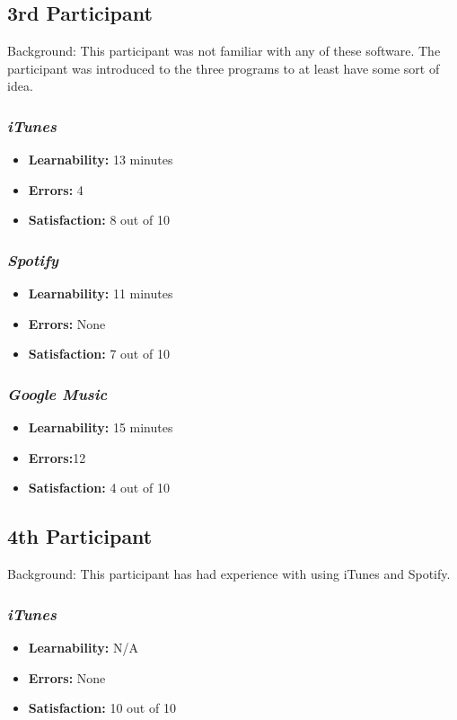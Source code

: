 \documentclass{article}
\begin{document}
\begin{multicols}{2}
\subsection{3rd Participant}
Background: This participant was not familiar with any of these software. The participant was introduced to the three programs to at least have some sort of idea.

\subsubsection{\it iTunes}
\begin{itemize}
	\item {\bf Learnability:} 13 minutes
	\item {\bf Errors:} 4
	\item {\bf Satisfaction:} 8 out of 10 
\end{itemize}

\subsubsection{\it Spotify}
\begin{itemize}
	\item {\bf Learnability:} 11 minutes
	\item {\bf Errors:} None
	\item {\bf Satisfaction:} 7 out of 10 
\end{itemize}

\subsubsection{\it Google Music}
\begin{itemize}
\item {\bf Learnability:} 15 minutes
	\item {\bf Errors:}12
	\item {\bf Satisfaction:} 4 out of 10 
\end{itemize}

\subsection{4th Participant}
Background: This participant has had experience with using iTunes and Spotify.

\subsubsection{\it iTunes}
\begin{itemize}
	\item {\bf Learnability:} N/A
	\item {\bf Errors:} None
	\item {\bf Satisfaction:} 10 out of 10 
\end{itemize}


\end{multicols}
\end{document}
